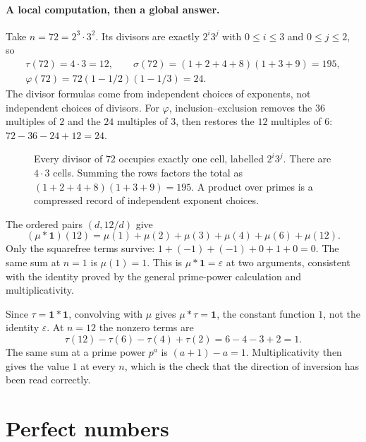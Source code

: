 \paragraph{A local computation, then a global answer.}
Take $n=72=2^3\cdot3^2$. Its divisors are exactly $2^i3^j$ with
$0\le i\le3$ and $0\le j\le2$, so
\[
\begin{gathered}
 \tau(72)=4\cdot3=12,\qquad
 \sigma(72)=(1+2+4+8)(1+3+9)=195,\\
 \varphi(72)=72(1-1/2)(1-1/3)=24.
\end{gathered}
\]
The divisor formulas come from independent choices of exponents, not independent
choices of divisors. For $\varphi$, inclusion--exclusion removes the $36$
multiples of $2$ and the $24$ multiples of $3$, then restores the $12$
multiples of $6$: $72-36-24+12=24$.

\begin{figure}[ht]
\centering
{}
\caption{Every divisor of $72$ occupies exactly one cell, labelled $2^i3^j$.
There are $4\cdot3$ cells. Summing the rows factors the total as
$(1+2+4+8)(1+3+9)=195$. A product over primes is a compressed record of
independent exponent choices.}
\label{fig:divisorgrid}
\end{figure}

\begin{examplex}[convolution at $n=12$]
The ordered pairs $(d,12/d)$ give
\[
(\mu*\mathbf 1)(12)=\mu(1)+\mu(2)+\mu(3)+\mu(4)+\mu(6)+\mu(12).
\]
Only the squarefree terms survive: $1+(-1)+(-1)+0+1+0=0$.
The same sum at $n=1$ is $\mu(1)=1$. This is $\mu*\mathbf 1=\varepsilon$ at two arguments, consistent with the identity proved by the general prime-power calculation and multiplicativity.
\end{examplex}

\begin{examplex}
Since $\tau=\mathbf 1*\mathbf 1$, convolving with $\mu$ gives $\mu*\tau=\mathbf 1$, the constant function $1$, not the identity $\varepsilon$.
At $n=12$ the nonzero terms are
\[
\tau(12)-\tau(6)-\tau(4)+\tau(2)=6-4-3+2=1.
\]
The same sum at a prime power $p^a$ is $(a+1)-a=1$. Multiplicativity then gives the value $1$ at every $n$, which is the check that the direction of inversion has been read correctly.
\end{examplex}

\section{Perfect numbers}

